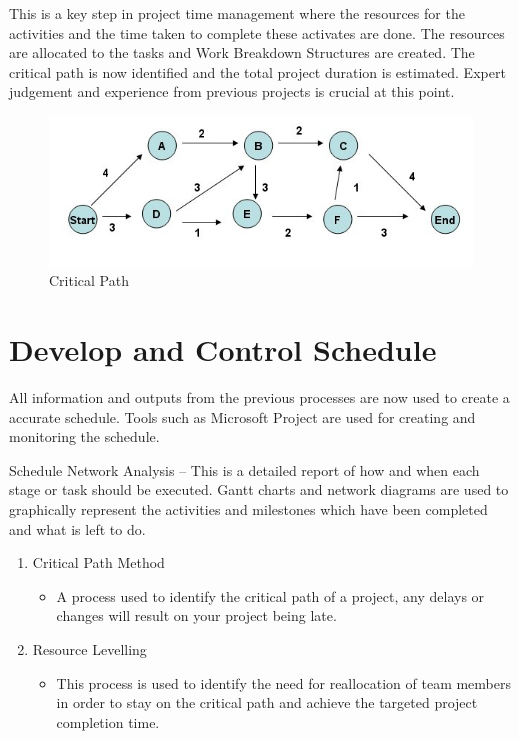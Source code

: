 This is a key step in project time management where the resources for the activities and the time taken to complete these activates are done. The resources are allocated to the tasks and Work Breakdown Structures are created. The critical path is now identified and the total project duration is estimated. Expert judgement and experience from previous projects is crucial at this point.

\begin{figure} [H]
\begin{center}
\includegraphics[scale=0.7]{ch5.png}
\caption{Critical Path}
\label{fig:criticalpath}
\end{center}
\end{figure}

\section{Develop and Control Schedule}

All information and outputs from the previous processes are now used to create a accurate schedule. Tools such as Microsoft Project are used for creating and monitoring the schedule. 

Schedule Network Analysis – This is a detailed report of how and when each stage or task should be executed. Gantt charts and network diagrams are used to graphically represent the activities and milestones which have been completed and what is left to do. 

\begin{enumerate}
\item Critical Path Method
\begin{itemize}
\item A process used to identify the critical path of a project, any delays or changes will result on your project being late.
\end{itemize}
\item Resource Levelling
\begin{itemize}
\item This process is used to identify the need for reallocation of team members in order to stay on the critical path and achieve the targeted project completion time.
\end{itemize}
\end{enumerate}

